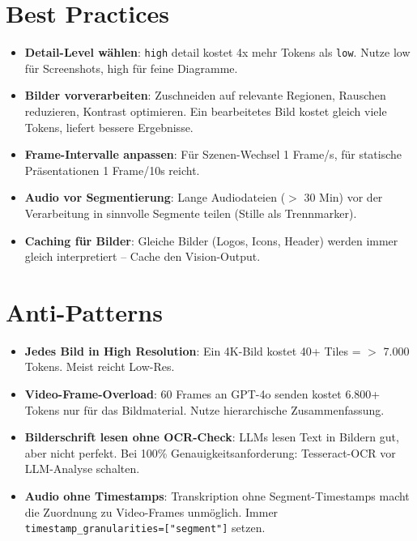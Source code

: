\section{Best Practices}

\begin{itemize}[leftmargin=*]
    \item \textbf{Detail-Level wählen}: \texttt{high} detail kostet 4x mehr Tokens als \texttt{low}. Nutze low für Screenshots, high für feine Diagramme.
    \item \textbf{Bilder vorverarbeiten}: Zuschneiden auf relevante Regionen, Rauschen reduzieren, Kontrast optimieren. Ein bearbeitetes Bild kostet gleich viele Tokens, liefert bessere Ergebnisse.
    \item \textbf{Frame-Intervalle anpassen}: Für Szenen-Wechsel 1 Frame/s, für statische Präsentationen 1 Frame/10s reicht.
    \item \textbf{Audio vor Segmentierung}: Lange Audiodateien ($>$ 30 Min) vor der Verarbeitung in sinnvolle Segmente teilen (Stille als Trennmarker).
    \item \textbf{Caching für Bilder}: Gleiche Bilder (Logos, Icons, Header) werden immer gleich interpretiert -- Cache den Vision-Output.
\end{itemize}

\section{Anti-Patterns}

\begin{itemize}[leftmargin=*]
    \item \textbf{Jedes Bild in High Resolution}: Ein 4K-Bild kostet 40+ Tiles = $>$ 7.000 Tokens. Meist reicht Low-Res.
    \item \textbf{Video-Frame-Overload}: 60 Frames an GPT-4o senden kostet 6.800+ Tokens nur für das Bildmaterial. Nutze hierarchische Zusammenfassung.
    \item \textbf{Bilderschrift lesen ohne OCR-Check}: LLMs lesen Text in Bildern gut, aber nicht perfekt. Bei 100\% Genauigkeitsanforderung: Tesseract-OCR vor LLM-Analyse schalten.
    \item \textbf{Audio ohne Timestamps}: Transkription ohne Segment-Timestamps macht die Zuordnung zu Video-Frames unmöglich. Immer \texttt{timestamp\_granularities=["segment"]} setzen.
\end{itemize}

